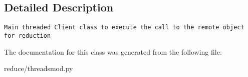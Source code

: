 \subsection{Detailed Description}


\footnotesize\begin{verbatim}
Main threaded Client class to execute the call to the remote object for reduction  
\end{verbatim}
\normalsize
 



The documentation for this class was generated from the following file:\begin{CompactItemize}
\item 
reduce/threadsmod.py\end{CompactItemize}
